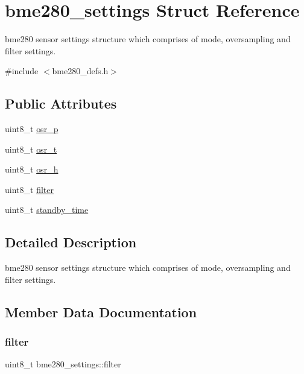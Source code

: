 \hypertarget{structbme280__settings}{}\section{bme280\+\_\+settings Struct Reference}
\label{structbme280__settings}


bme280 sensor settings structure which comprises of mode, oversampling and filter settings.  




{\ttfamily \#include $<$bme280\+\_\+defs.\+h$>$}

\subsection*{Public Attributes}
\begin{DoxyCompactItemize}
\item 
uint8\+\_\+t \hyperlink{structbme280__settings_a6359b35d9547f53dea01d893313c7dc3}{osr\+\_\+p}
\item 
uint8\+\_\+t \hyperlink{structbme280__settings_a49bf8f73813386b4dc37a9676230c263}{osr\+\_\+t}
\item 
uint8\+\_\+t \hyperlink{structbme280__settings_ab09e8c0b2ff1ee7e7eb35540ad95acf5}{osr\+\_\+h}
\item 
uint8\+\_\+t \hyperlink{structbme280__settings_a46eae004d968b4fd9a89e5cb5748f1c1}{filter}
\item 
uint8\+\_\+t \hyperlink{structbme280__settings_a9c881ed1a45bfd9092260383f13c9fbc}{standby\+\_\+time}
\end{DoxyCompactItemize}


\subsection{Detailed Description}
bme280 sensor settings structure which comprises of mode, oversampling and filter settings. 

\subsection{Member Data Documentation}
\mbox{\label{structbme280__settings_a46eae004d968b4fd9a89e5cb5748f1c1}} 
\subsubsection{\texorpdfstring{filter}{filter}}
{\footnotesize\ttfamily uint8\+\_\+t bme280\+\_\+settings\+::filter}

